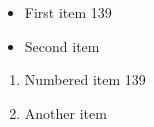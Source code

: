 \documentclass{article}
\begin{document}
\begin{itemize}
\item First item 139
\item Second item
\end{itemize}
\begin{enumerate}
\item Numbered item 139
\item Another item
\end{enumerate}
\end{document}
